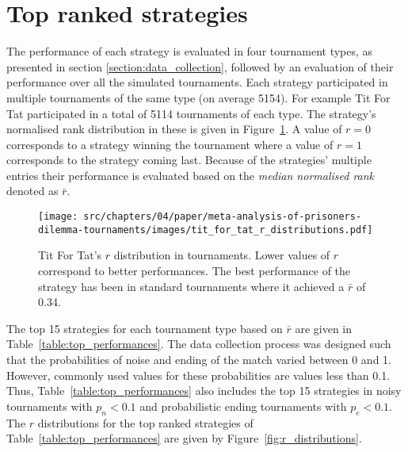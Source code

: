 \section{Top ranked strategies}\label{section:top_performances}

The performance of each strategy is evaluated in four tournament types, as
presented in section \ref{section:data_collection}, followed by an
evaluation of their performance over all the \numberofalltournaments simulated
tournaments. Each strategy participated in multiple tournaments of
the same type (on average 5154). For example Tit For Tat participated in a
total of 5114 tournaments of each type. The strategy's normalised rank
distribution in these is given in Figure~\ref{fig:tit_for_tat_r_distribution}. A
value of \(r = 0\) corresponds to a strategy winning the tournament where a
value of \(r = 1\) corresponds to the strategy coming last. Because of the
strategies' multiple entries their performance is evaluated based on the
\textit{median normalised rank} denoted as \(\bar{r}\).

\begin{figure}[!htbp]
    \centering
    \texttt{[image: src/chapters/04/paper/meta-analysis-of-prisoners-dilemma-tournaments/images/tit\_for\_tat\_r\_distributions.pdf]}
    \caption{Tit For Tat's $r$ distribution in tournaments. Lower values of \(r\)
    correspond to better performances. The best performance
    of the strategy has been in standard tournaments where it achieved a $\bar{r}$
    of 0.34.}
    \label{fig:tit_for_tat_r_distribution}
\end{figure}

The top 15 strategies for each tournament type based on \(\bar{r}\) are given in
Table~\ref{table:top_performances}. The data collection process was designed such
that the probabilities of noise and ending of the match varied between 0 and
1. However, commonly used values for these probabilities are values less than 0.1.
Thus,
Table~\ref{table:top_performances} also includes the top 15 strategies in noisy
tournaments with \(p_n < 0.1\) and probabilistic ending tournaments with \(p_e <
0.1\). The \(r\) distributions for the top ranked strategies of Table~\ref{table:top_performances}
are given by Figure~\ref{fig:r_distributions}.

